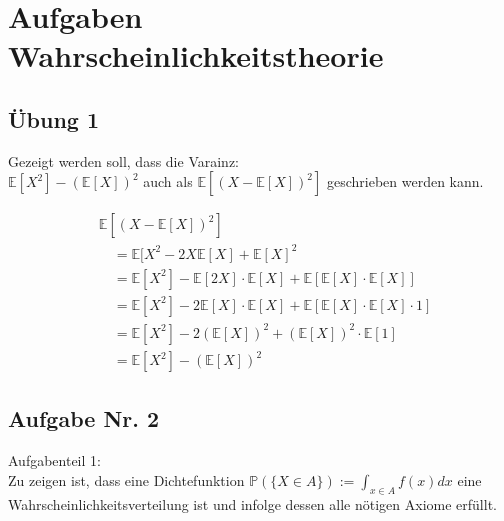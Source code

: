 \section{Aufgaben Wahrscheinlichkeitstheorie}
\subsection{Übung 1}
Gezeigt werden soll, dass die Varainz:\\
 $\mathbb{E} [X^2] - (\mathbb{E} [X])^2$ auch als $\mathbb{E} [(X- \mathbb{E} [X] )^2 ]$ geschrieben werden kann.	

\begin{align*}
&\mathbb{E} [(X- \mathbb{E} [X] )^2 ] \\
&\quad= \mathbb{E} [X^2 - 2X \mathbb{E} [X] + \mathbb{E} [X]^2 \\
&\quad= \mathbb{E} [X^2] - \mathbb{E} [2X]  \cdot \mathbb{E} [X] + \mathbb{E} [\mathbb{E} [X] \cdot \mathbb{E} [X]]\\
&\quad= \mathbb{E} [X^2] - 2\mathbb{E} [X] \cdot \mathbb{E} [X] +  \mathbb{E} [\mathbb{E} [X] \cdot \mathbb{E} [X] \cdot 1]\\
&\quad= \mathbb{E} [X^2] - 2(\mathbb{E} [X])^2 + (\mathbb{E} [X])^2 \cdot \mathbb{E} [1]\\
&\quad= \mathbb{E} [X^2] - (\mathbb{E} [X])^2
\end{align*}


\subsection{Aufgabe Nr. 2}
Aufgabenteil 1:\\
Zu zeigen ist, dass eine Dichtefunktion $\mathbb{P}(\{X\in A\}):=\int_{x\in A}f(x)dx$ eine Wahrscheinlichkeitsverteilung ist und infolge dessen alle nötigen Axiome erfüllt.\\

